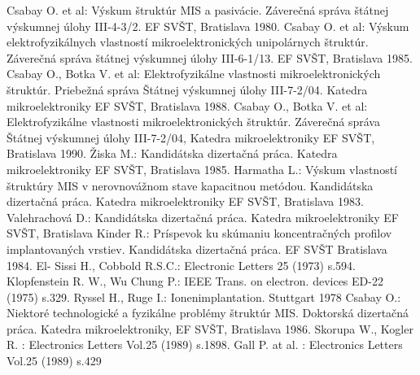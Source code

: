 \begin{thebibliography}{}
 Csabay O. et al: Výskum štruktúr MIS a
  pasivácie. Záverečná správa štátnej výskumnej úlohy III-4-3/2. EF
  SVŠT, Bratislava 1980.
 Csabay O. et al: Výskum elektrofyzikálnych
  vlastností mikroelektronických unipolárnych štruktúr. Záverečná
  správa štátnej výskumnej úlohy III-6-1/13. EF SVŠT, Bratislava 1985.
 Csabay O., Botka V. et al: Elektrofyzikálne
  vlastnosti mikroelektronických štruktúr. Priebežná správa Štátnej
  výskumnej úlohy III-7-2/04. Katedra mikroelektroniky EF SVŠT,
  Bratislava 1988.
 Csabay O., Botka V. et al: Elektrofyzikálne
  vlastnosti mikroelektronických štruktúr. Záverečná správa Štátnej
  výskumnej úlohy III-7-2/04, Katedra mikroelektroniky EF SVŠT,
  Bratislava 1990.
 Žiska M.: Kandidátska dizertačná práca. Katedra
  mikroelektroniky EF SVŠT, Bratislava 1985.
 Harmatha L.: Výskum vlastností štruktúry MIS v
  nerovnovážnom stave kapacitnou metódou. Kandidátska dizertačná
  práca. Katedra mikroelektroniky EF SVŠT, Bratislava 1983.
 Valehrachová D.: Kandidátska dizertačná
  práca. Katedra mikroelektroniky EF SVŠT, Bratislava
 Kinder R.: Príspevok ku skúmaniu koncentračných
  profilov implantovaných vrstiev. Kandidátska dizertačná práca. EF
  SVŠT Bratislava 1984.
El- Sissi H., Cobbold R.S.C.: Electronic Letters 25 (1973) s.594.
 Klopfenstein R. W., Wu Chung P.: IEEE Trans. on
  electron. devices ED-22 (1975) s.329.
Ryssel H., Ruge I.: Ionenimplantation. Stuttgart 1978
 Csabay O.: Niektoré technologické a fyzikálne
  problémy štruktúr MIS. Doktorská dizertačná práca. Katedra
  mikroelektroniky, EF SVŠT, Bratislava 1986.
Skorupa W., Kogler R. : Electronics Letters Vol.25 (1989) s.1898.
Gall P. at al. : Electronics Letters Vol.25 (1989) s.429
\end{thebibliography}

